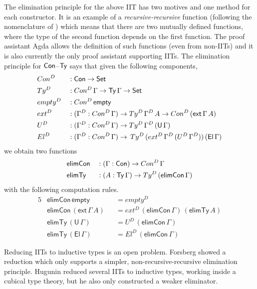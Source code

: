 \documentclass[a4paper,UKenglish,cleveref, autoref]{lipics-v2019}
\begin{document}
The elimination principle for the above IIT has two motives and one method
for each constructor. It is an example of a \emph{recursive-recursive}
function (following the nomenclature of \cite{forsberg-phd}) which
means that there are two mutually defined functions, where the type of
the second function depends on the first function. The proof assistant
Agda \cite{norell07thesis} allows the definition of such functions
(even from non-IITs) and it is also currently the only proof assistant
supporting IITs. The elimination principle for $\mathsf{Con}$--$\mathsf{Ty}$ says that
given the following components,
\begin{alignat*}{5}
  & Con^D && : \mathsf{Con}\rightarrow\mathsf{Set} \\
  & Ty^D && : Con^D\,\Gamma\rightarrow\mathsf{Ty}\,\Gamma\rightarrow\mathsf{Set} \\
  & empty^D && : Con^D\,\mathsf{empty} \\
  & ext^D && : (\Gamma^D:Con^D\,\Gamma)\rightarrow Ty^D\,\Gamma^D\,A\rightarrow Con^D\,(\mathsf{ext}\,\Gamma\,A) \\
  & U^D && : (\Gamma^D:Con^D\,\Gamma)\rightarrow Ty^D\,\Gamma^D\,(\mathsf{U}\,\Gamma) \\
  & El^D && : (\Gamma^D:Con^D\,\Gamma)\rightarrow\,Ty^D\,(ext^D\,\Gamma^D\,(U^D\,\Gamma^D))\,(\mathsf{El}\,\Gamma)
\end{alignat*}
we obtain two functions
\begin{alignat*}{5}
  & \mathsf{elimCon} && : (\Gamma:\mathsf{Con})\rightarrow Con^D\,\Gamma \\
  & \mathsf{elimTy} && : (A:\mathsf{Ty}\,\Gamma)\rightarrow Ty^D\,(\mathsf{elimCon}\,\Gamma)
\end{alignat*}
with the following computation rules.
\begin{alignat*}{5}
  & \mathsf{elimCon}\,\mathsf{empty} && = empty^D \\
  & \mathsf{elimCon}\,(\mathsf{ext}\,\Gamma\,A) && = ext^D\,(\mathsf{elimCon}\,\Gamma)\,(\mathsf{elimTy}\,A) \\
  & \mathsf{elimTy}\,(\mathsf{U}\,\Gamma) && = U^D\,(\mathsf{elimCon}\,\Gamma) \\
  & \mathsf{elimTy}\,(\mathsf{El}\,\Gamma) && = El^D\,(\mathsf{elimCon}\,\Gamma)
\end{alignat*}

Reducing IITs to inductive types is an open problem. Forsberg
\cite{forsberg-phd} showed a reduction which only supports a simpler,
non-recursive-recursive elimination principle. Hugunin \cite{jasper} reduced
several IITs to inductive types, working inside a cubical type theory, but he
also only constructed a weaker eliminator.
\end{document}
